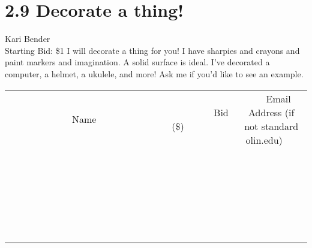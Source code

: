 \documentclass[11pt]{article}
\begin{document}
\section*{2.9 Decorate a thing!}
Kari Bender
\\
Starting Bid: \$1
\newline
I will decorate a thing for you! I have sharpies and crayons and paint markers and imagination. A solid surface is ideal. I've decorated a computer, a helmet, a ukulele, and more! Ask me if you'd like to see an example.
\\[6ex]
\begin{tabular}{c c c}
~~~~~~~~~~~~~Name~~~~~~~~~~~~~ & ~~~~~~~~~Bid (\$)~~~~~~~~~  & ~~~Email Address (if not standard olin.edu)~~~\\
 & & \\
\hline
 & & \\
\hline
 & & \\
\hline
 & & \\
\hline
 & & \\
\hline
 & & \\
\hline
 & & \\
\hline
 & & \\
\hline
 & & \\
\hline
 & & \\
\hline
 & & \\
\hline
 & & \\
\hline
 & & \\
\hline
 & & \\
\hline
 & & \\
\hline
 & & \\
\hline
 & & \\
\hline
 & & \\
\hline
 & & \\
\hline
 & & \\
\hline
 & & \\
\hline
 & & \\
\hline
 & & \\
\hline
 & & \\
\hline
 & & \\
\hline
 & & \\
\hline
\end{tabular}
\newpage
\end{document}
